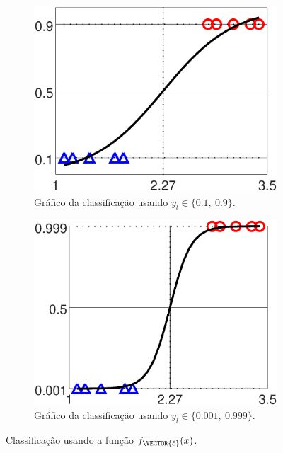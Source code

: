 \begin{figure}[!h]
    \begin{subfigure}[b]{0.45\textwidth}
        \centering
        \includegraphics[width=\textwidth]{chapters/classificacao/mfiles/reglogr1r1/ex1s1-reglogr1r1.eps}
        \caption{Gráfico da classificação usando $y_l \in \{0.1,~ 0.9\}$.}
        \label{fig:theo:reglogr1r1:xn:s1}
    \end{subfigure}
    \hfill
    \begin{subfigure}[b]{0.45\textwidth}
        \centering
        \includegraphics[width=\textwidth]{chapters/classificacao/mfiles/reglogr1r1/ex1s2-reglogr1r1.eps}
        \caption{Gráfico da classificação usando $y_l \in \{0.001,~ 0.999\}$.}
        \label{fig:theo:reglogr1r1:xn:s2}
    \end{subfigure}
    \caption{Classificação usando a função $f_{\VECTOR{\hat{c}}}(x)$.}
    \label{fig:theo:reglogr1r1:xn}
\end{figure}


